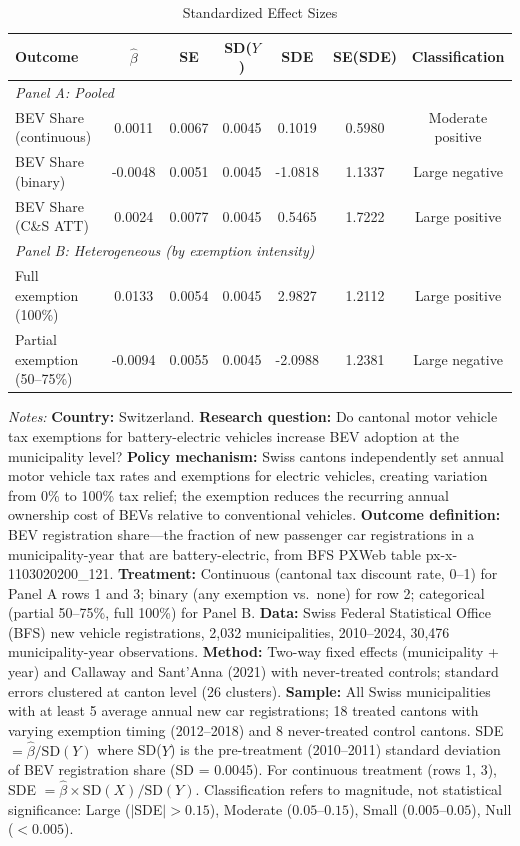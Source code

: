 \begin{table}[htbp]
\centering
\caption{Standardized Effect Sizes}
\label{tab:sde}
\small
\begin{tabular}{lcccccc}
\toprule
Outcome & $\hat{\beta}$ & SE & SD($Y$) & SDE & SE(SDE) & Classification \\
\midrule
\multicolumn{7}{l}{\textit{Panel A: Pooled}} \\[3pt]
BEV Share (continuous) & 0.0011 & 0.0067 & 0.0045 & 0.1019 & 0.5980 & Moderate positive \\
BEV Share (binary) & -0.0048 & 0.0051 & 0.0045 & -1.0818 & 1.1337 & Large negative \\
BEV Share (C\&S ATT) & 0.0024 & 0.0077 & 0.0045 & 0.5465 & 1.7222 & Large positive \\
[6pt]
\multicolumn{7}{l}{\textit{Panel B: Heterogeneous (by exemption intensity)}} \\[3pt]
Full exemption (100\%) & 0.0133 & 0.0054 & 0.0045 & 2.9827 & 1.2112 & Large positive \\
Partial exemption (50--75\%) & -0.0094 & 0.0055 & 0.0045 & -2.0988 & 1.2381 & Large negative \\
\bottomrule
\end{tabular}
\begin{tablenotes}
\item \textit{Notes:} \textbf{Country:} Switzerland. \textbf{Research question:} Do cantonal motor vehicle tax exemptions for battery-electric vehicles increase BEV adoption at the municipality level? \textbf{Policy mechanism:} Swiss cantons independently set annual motor vehicle tax rates and exemptions for electric vehicles, creating variation from 0\% to 100\% tax relief; the exemption reduces the recurring annual ownership cost of BEVs relative to conventional vehicles. \textbf{Outcome definition:} BEV registration share---the fraction of new passenger car registrations in a municipality-year that are battery-electric, from BFS PXWeb table px-x-1103020200\_121. \textbf{Treatment:} Continuous (cantonal tax discount rate, 0--1) for Panel A rows 1 and 3; binary (any exemption vs.\ none) for row 2; categorical (partial 50--75\%, full 100\%) for Panel B. \textbf{Data:} Swiss Federal Statistical Office (BFS) new vehicle registrations, 2,032 municipalities, 2010--2024, 30,476 municipality-year observations. \textbf{Method:} Two-way fixed effects (municipality + year) and Callaway and Sant'Anna (2021) with never-treated controls; standard errors clustered at canton level (26 clusters). \textbf{Sample:} All Swiss municipalities with at least 5 average annual new car registrations; 18 treated cantons with varying exemption timing (2012--2018) and 8 never-treated control cantons. SDE $= \hat{\beta} / \text{SD}(Y)$ where SD($Y$) is the pre-treatment (2010--2011) standard deviation of BEV registration share (SD = 0.0045). For continuous treatment (rows 1, 3), SDE $= \hat{\beta} \times \text{SD}(X) / \text{SD}(Y)$. Classification refers to magnitude, not statistical significance: Large ($|$SDE$| > 0.15$), Moderate ($0.05$--$0.15$), Small ($0.005$--$0.05$), Null ($< 0.005$).
\end{tablenotes}
\end{table}
